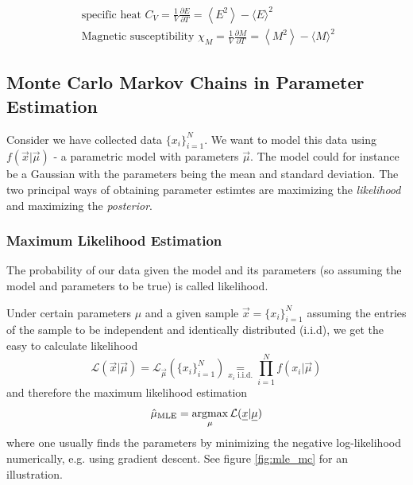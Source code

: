 \begin{equation}
    \begin{gathered}
        \text { specific heat } C_V=\frac{1}{V} \frac{\partial E}{\partial T}=\left\langle E^2\right\rangle-\langle E\rangle^2 \\
        \text { Magnetic susceptibility } \chi_M=\frac{1}{V} \frac{\partial M}{\partial T}=\left\langle M^2\right\rangle-\langle M\rangle^2
    \end{gathered}
\end{equation}

\subsection{Monte Carlo Markov Chains in Parameter Estimation}
Consider we have collected data $\{x_i\}_{i=1}^N$.
We want to model this data using $f(\vec{x}|\vec{\mu})$ - a parametric
model with parameters $\vec{\mu}$. The model could for instance
be a Gaussian with the parameters being the mean and standard deviation.
The two principal ways of obtaining parameter estimtes are maximizing
the \textit{likelihood} and maximizing the \textit{posterior}.

\subsubsection{Maximum Likelihood Estimation}
The probability of our data given the model and its parameters (so assuming
the model and parameters to be true) is called likelihood.

Under certain parameters $\mu$ and a given sample $\vec{x} = \{x_i\}_{i=1}^N$
assuming the entries of the sample to be independent and identically
distributed (i.i.d), we get the easy to calculate likelihood
\begin{equation}
    \mathcal{L}(\vec{x}|\vec{\mu}) = \mathcal{L}_\vec{\mu}(\{x_i\}_{i=1}^N) \underset{x_i \text{ i.i.d.}}{=} \prod_{i=1}^{N} f(x_i|\vec{\mu})
\end{equation}
and therefore the maximum likelihood estimation
\begin{equation}
    \hat{\mu}_\text{MLE} = \argmax_{\mu} \mathcal{L}(\vec{x}|\vec{\mu})
\end{equation}
where one usually finds the parameters by minimizing the negative log-likelihood numerically,
e.g. using gradient descent. See figure \ref{fig:mle_mc} for an illustration.

